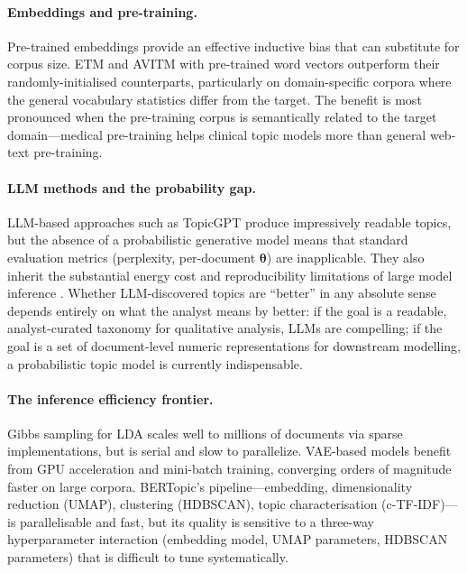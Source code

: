 \documentclass[11pt,a4paper]{article}
\newcommand{\vect}[1]{\boldsymbol{#1}}
\begin{document}
\paragraph{Embeddings and pre-training.}
Pre-trained embeddings provide an effective inductive bias that can
substitute for corpus size.
ETM and AVITM with pre-trained word vectors outperform their
randomly-initialised counterparts, particularly on domain-specific
corpora where the general vocabulary statistics differ from the target.
The benefit is most pronounced when the pre-training corpus is
semantically related to the target domain---medical pre-training helps
clinical topic models more than general web-text pre-training.

\paragraph{LLM methods and the probability gap.}
LLM-based approaches such as TopicGPT produce impressively readable
topics, but the absence of a probabilistic generative model means that
standard evaluation metrics (perplexity, per-document $\vect{\theta}$)
are inapplicable.
They also inherit the substantial energy cost and reproducibility
limitations of large model inference \parencite{strubell2019energy}.
Whether LLM-discovered topics are ``better'' in any absolute sense
depends entirely on what the analyst means by better: if the goal is
a readable, analyst-curated taxonomy for qualitative analysis, LLMs
are compelling; if the goal is a set of document-level numeric
representations for downstream modelling, a probabilistic topic model
is currently indispensable.

\paragraph{The inference efficiency frontier.}
Gibbs sampling for LDA scales well to millions of documents via
sparse implementations, but is serial and slow to parallelize.
VAE-based models benefit from GPU acceleration and mini-batch training,
converging orders of magnitude faster on large corpora.
BERTopic's pipeline---embedding, dimensionality reduction (UMAP),
clustering (HDBSCAN), topic characterisation (c-TF-IDF)---is
parallelisable and fast, but its quality is sensitive to a three-way
hyperparameter interaction (embedding model, UMAP parameters, HDBSCAN
parameters) that is difficult to tune systematically.
\end{document}
